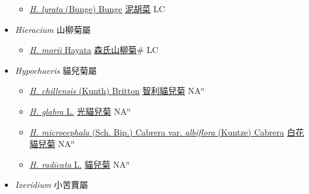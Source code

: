 \begin{itemize}
  \begin{itemize}
        \item[] \href{http://www.theplantlist.org/tpl1.1/search?q=Hemistepta+lyrata}{\textit{H. lyrata} (Bunge) Bunge}   \href{\detokenize{http://taibnet.sinica.edu.tw/chi/taibnet_species_list.php?T2=泥胡菜&T2_new_value=true&fr=y}}{泥胡菜} LC
  \end{itemize}
 \item[] \textit{Hieracium} 山柳菊屬
                    
  \begin{itemize}
        \item[] \href{http://www.theplantlist.org/tpl1.1/search?q=Hieracium+morii}{\textit{H. morii} Hayata}   \href{\detokenize{http://taibnet.sinica.edu.tw/chi/taibnet_species_list.php?T2=森氏山柳菊&T2_new_value=true&fr=y}}{森氏山柳菊}\# LC
  \end{itemize}
 \item[] \textit{Hypochaeris} 貓兒菊屬
                    
  \begin{itemize}
        \item[] \href{http://www.theplantlist.org/tpl1.1/search?q=Hypochaeris+chillensis}{\textit{H. chillensis} (Kunth) Britton}   \href{\detokenize{http://taibnet.sinica.edu.tw/chi/taibnet_species_list.php?T2=智利貓兒菊&T2_new_value=true&fr=y}}{智利貓兒菊} NA$^n$
        \item[] \href{http://www.theplantlist.org/tpl1.1/search?q=Hypochaeris+glabra}{\textit{H. glabra} L.}   \href{\detokenize{http://taibnet.sinica.edu.tw/chi/taibnet_species_list.php?T2=光貓兒菊&T2_new_value=true&fr=y}}{光貓兒菊} NA$^n$
        \item[] \href{http://www.theplantlist.org/tpl1.1/search?q=Hypochaeris+microcephala+var.+albiflora}{\textit{H. microcephala} (Sch. Bip.) Cabrera var. \textit{albiflora} (Kuntze) Cabrera}   \href{\detokenize{http://taibnet.sinica.edu.tw/chi/taibnet_species_list.php?T2=白花貓兒菊&T2_new_value=true&fr=y}}{白花貓兒菊} NA$^n$
        \item[] \href{http://www.theplantlist.org/tpl1.1/search?q=Hypochaeris+radicata}{\textit{H. radicata} L.}   \href{\detokenize{http://taibnet.sinica.edu.tw/chi/taibnet_species_list.php?T2=貓兒菊&T2_new_value=true&fr=y}}{貓兒菊} NA$^n$
  \end{itemize}
 \item[] \textit{Ixeridium} 小苦蕒屬
                    

\end{itemize}
